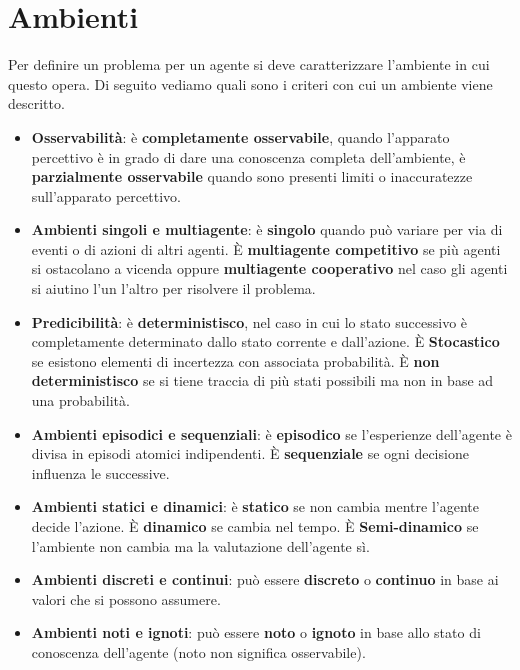 \section{Ambienti}
Per definire un problema per un agente si deve caratterizzare l'ambiente in cui questo opera.
Di seguito vediamo quali sono i criteri con cui un ambiente viene descritto.
\begin{itemize}
	\item \textbf{Osservabilit\`a}: \`e \textbf{completamente osservabile}, quando
	      l'apparato percettivo \`e in grado di dare una conoscenza completa dell'ambiente,
	      \`e \textbf{parzialmente osservabile} quando sono presenti limiti
	      o inaccuratezze sull'apparato percettivo.
	\item \textbf{Ambienti singoli e multiagente}: \`e \textbf{singolo} quando
	      pu\`o variare per via di eventi o di azioni di altri agenti.
	      \`E \textbf{multiagente competitivo} se pi\`u agenti si ostacolano a vicenda
	      oppure \textbf{multiagente cooperativo} nel caso gli agenti si aiutino l'un
	      l'altro per risolvere il problema.
	\item \textbf{Predicibilit\`a}: \`e \textbf{deterministisco}, nel caso in cui lo stato
	      successivo \`e completamente determinato dallo stato corrente e dall'azione. \`E
	      \textbf{Stocastico} se esistono elementi di incertezza con associata probabilit\`a.
	      \`E \textbf{non deterministisco} se si tiene traccia di pi\`u stati possibili ma
	      non in base ad una probabilit\`a.
	\item \textbf{Ambienti episodici e sequenziali}: \`e \textbf{episodico} se l'esperienze
	      dell'agente \`e divisa in episodi atomici indipendenti. \`E \textbf{sequenziale}
	      se ogni decisione influenza le successive.
	\item \textbf{Ambienti statici e dinamici}: \`e \textbf{statico} se non cambia mentre
	      l'agente decide l'azione. \`E \textbf{dinamico} se cambia nel tempo. \`E
	      \textbf{Semi-dinamico} se l'ambiente non cambia ma la valutazione dell'agente s\`i.
	\item \textbf{Ambienti discreti e continui}: pu\`o essere \textbf{discreto} o
	      \textbf{continuo} in base ai valori che si possono assumere.
	\item \textbf{Ambienti noti e ignoti}: pu\`o essere \textbf{noto} o \textbf{ignoto} in
	      base allo stato di conoscenza dell'agente (noto non significa osservabile).
\end{itemize}

